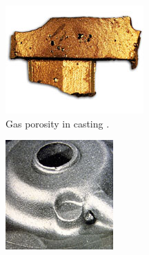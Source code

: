 \begin{figure}[htbp]
\centering
  \begin{subfigure}[t]{0.3\textwidth}
    \centering
	\includegraphics[width=\textwidth]{Chapter0/Graphics/porosity1.jpg}
	\caption{Gas porosity in casting \citep{afs_american_2014}.}
    \label{fig:porosity1}
  \end{subfigure}
   \hspace{1cm}
   \begin{subfigure}[t]{0.25\textwidth}
    \centering
	\includegraphics[width=\textwidth]{Chapter0/Graphics/porosity2.jpg}

\end{subfigure}
\end{figure}
